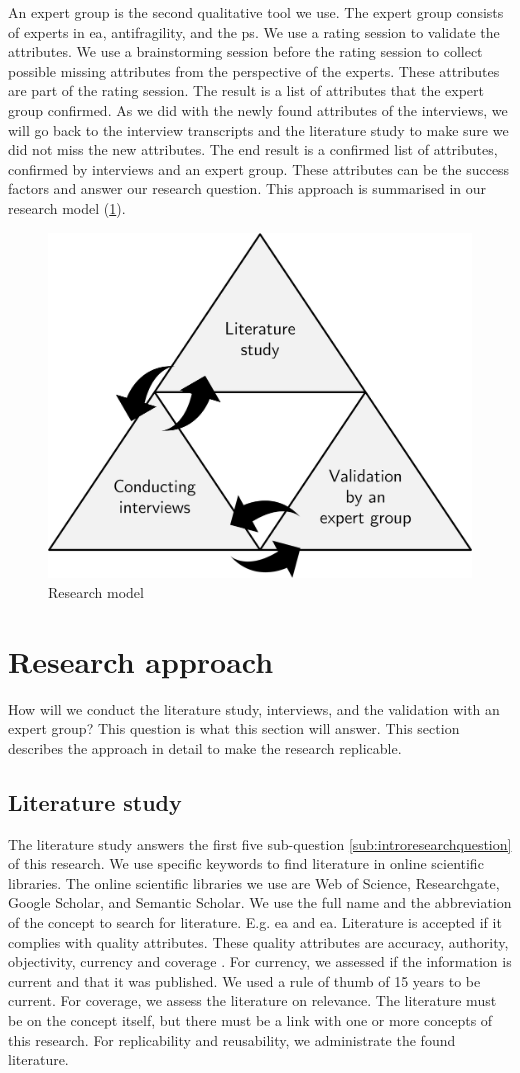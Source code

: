 An expert group is the second qualitative tool we use. The expert group consists of experts in \acrlong{ea}, \gls{antifragility}, and the \gls{ps}. We use a rating  session to validate the \glspl{attribute}. We use a brainstorming session before the rating session to collect possible missing \glspl{attribute} from the perspective of the experts. These \glspl{attribute} are part of the rating session. The result is a list of \glspl{attribute} that the expert group confirmed. As we did with the newly found \glspl{attribute} of the interviews, we will go back to the interview transcripts and the literature study to make sure we did not miss the new attributes. The end result is a confirmed list of \glspl{attribute}, confirmed by interviews and an expert group. These attributes can be the success factors and answer our research question. This approach is summarised in our research model (\cref{fig:researchmodel}).
\begin{figure}[H]
	\centering
	\includegraphics[width=0.45\linewidth]{images/researchmodel}
	\caption[Research model]{Research model}
	\label{fig:researchmodel}
\end{figure}

\section{Research approach}
\label{sec:researchapproach}
How will we conduct the literature study, interviews, and the validation with an expert group? This question is what this section will answer. This section describes the approach in detail to make the research replicable.
\subsection{Literature study}
\label{sub:literaturestudy}
The literature study answers the first five sub-question \cref{sub:introresearchquestion} of this research. We use specific keywords to find literature in online scientific libraries. The online scientific libraries we use are Web of Science, Researchgate, Google Scholar, and Semantic Scholar. We use the full name and the abbreviation of the concept to search for literature. E.g. \acrlong{ea} and \acrshort{ea}. Literature is accepted if it complies with quality \glspl{attribute}. These quality \glspl{attribute} are accuracy, authority, objectivity, currency and coverage \parencite{CityUniHongKong2021}. For currency, we assessed if the information is current and that it was published. We used a rule of thumb of 15 years to be current. For coverage, we assess the literature on relevance. The literature must be on the concept itself, but there must be a link with one or more concepts of this research. For replicability and reusability, we administrate the found literature.

